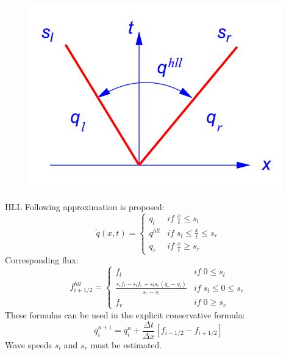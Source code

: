 	
\begin{frame}		
\begin{figure}
\centering
\includegraphics[width=0.9\linewidth]{../../figs/hll_fig}
\label{fig:hll_fig}
\end{figure}
\end{frame}

\begin{frame}{HLL}
	Following approximation is proposed:
	\begin{equation*}
	\tilde{q}(x,t) = \left\{ \begin{matrix} q_l & if \; \frac{x}{t} \leq s_l \\ q^{hll} & if \;  s_l \leq \frac{x}{t} \leq s_r \\ q_r & if \; \frac{x}{t} \geq s_r \end{matrix}\right.
	\end{equation*}
	Corresponding flux:
	\begin{equation*}
	f_{i+1/2}^{hll} = \left\{ \begin{matrix} f_l & if \; 0 \leq s_l \\ \frac{s_r f_l - s_l f_r + s_l s_r (q_r - q_l)}{s_r - s_l}	 & if \;  s_l \leq 0 \leq s_r \\ f_r & if \; 0 \geq s_r \end{matrix}\right.
	\end{equation*}
	These formulas can be used in the explicit conservative formula:
	\begin{equation*}
	q_i^{n+1} = q_i^n + \frac{\Delta t}{\Delta x} \left[ f_{i-1/2} - f_{i+1/2} \right] 	
	\end{equation*}
	Wave speeds $s_l$ and $s_r$ must be estimated.
\end{frame}


